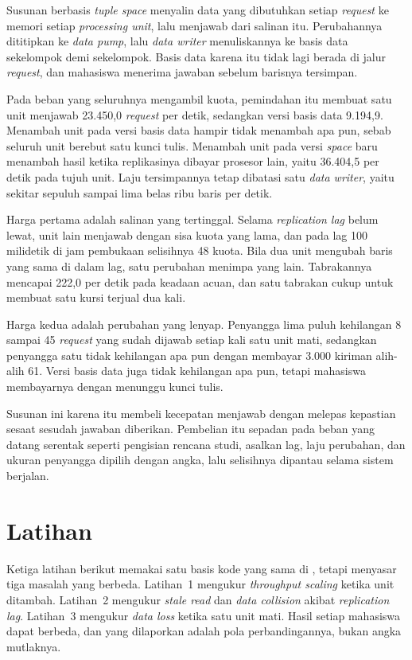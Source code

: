 Susunan berbasis \textit{tuple space} menyalin data yang dibutuhkan setiap
\textit{request} ke memori setiap \textit{processing unit}, lalu menjawab dari
salinan itu. Perubahannya dititipkan ke \textit{data pump}, lalu \textit{data
writer} menuliskannya ke basis data sekelompok demi sekelompok. Basis data
karena itu tidak lagi berada di jalur \textit{request}, dan mahasiswa menerima
jawaban sebelum barisnya tersimpan.

Pada beban yang seluruhnya mengambil kuota, pemindahan itu membuat satu unit
menjawab 23.450,0 \textit{request} per detik, sedangkan versi basis data 9.194,9.
Menambah unit pada versi basis data hampir tidak menambah apa pun, sebab
seluruh unit berebut satu kunci tulis. Menambah unit pada versi \textit{space}
baru menambah hasil ketika replikasinya dibayar prosesor lain, yaitu 36.404,5
per detik pada tujuh unit. Laju tersimpannya tetap dibatasi satu \textit{data
writer}, yaitu sekitar sepuluh sampai lima belas ribu baris per detik.

Harga pertama adalah salinan yang tertinggal. Selama \textit{replication lag}
belum lewat, unit lain menjawab dengan sisa kuota yang lama, dan pada lag 100
milidetik di jam pembukaan selisihnya 48 kuota. Bila dua unit mengubah baris
yang sama di dalam lag, satu perubahan menimpa yang lain. Tabrakannya mencapai
222,0 per detik pada keadaan acuan, dan satu tabrakan cukup untuk membuat satu
kursi terjual dua kali.

Harga kedua adalah perubahan yang lenyap. Penyangga lima puluh kehilangan 8
sampai 45 \textit{request} yang sudah dijawab setiap kali satu unit mati,
sedangkan penyangga satu tidak kehilangan apa pun dengan membayar 3.000 kiriman
alih-alih 61. Versi basis data juga tidak kehilangan apa pun, tetapi mahasiswa
membayarnya dengan menunggu kunci tulis.

Susunan ini karena itu membeli kecepatan menjawab dengan melepas kepastian
sesaat sesudah jawaban diberikan. Pembelian itu sepadan pada beban yang datang
serentak seperti pengisian rencana studi, asalkan lag, laju perubahan, dan
ukuran penyangga dipilih dengan angka, lalu selisihnya dipantau selama sistem
berjalan.

\section{Latihan}

Ketiga latihan berikut memakai satu basis kode yang sama di
, tetapi menyasar tiga masalah yang berbeda.
Latihan~1 mengukur \textit{throughput scaling} ketika unit ditambah. Latihan~2
mengukur \textit{stale read} dan \textit{data collision} akibat
\textit{replication lag}. Latihan~3 mengukur \textit{data loss} ketika satu
unit mati. Hasil setiap mahasiswa dapat berbeda, dan yang dilaporkan adalah pola
perbandingannya, bukan angka mutlaknya.

